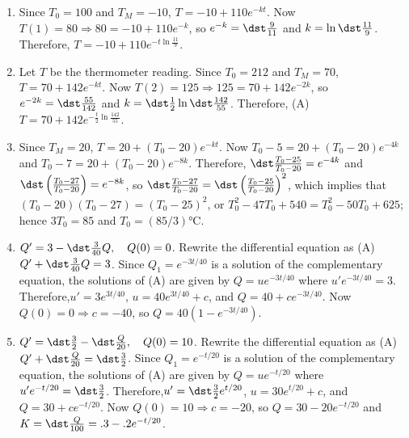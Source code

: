 \documentclass[openany]{book}
\newenvironment{sectionSolutions}{
 \begin{enumerate}[item-label={\thesection.\arabic{enumi}.}]
}{
 \end{enumerate}
}
\begin{document}
\begin{sectionSolutions}
\item
Since $T_0=100$ and $T_M=-10$, $T=-10+110e^{-kt}$. Now
$T(1)=80\Rightarrow 80=-10+110e^{-k}$, so $e^{-k}=\dst\frac{9}{11}$
and $k=\ln\dst\frac{11}{9}$. Therefore, $T=-10+110e^{-t\ln\frac{11}{9}}$.


\item
Let $T$ be the thermometer reading.
Since $T_0=212$ and $T_M=70$, $T=70+142e^{-kt}$. Now
$T(2)=125\Rightarrow 125=70+142e^{-2k}$, so
$e^{-2k}=\dst\frac{55}{142}$
and $k=\dst\frac{1}{2}\ln\dst\frac{142}{55}$. Therefore,
(A) $T=70+142e^{-\frac{t}{2}\ln\frac{142}{55}}$.


\item
Since $T_M=20$, $T=20+(T_0-20)e^{-kt}$. Now
$T_0-5=20+(T_0-20)e^{-4k}$  and $T_0-7=20+(T_0-20)e^{-8k}$. Therefore,
$\dst\frac{T_0-25}{ T_0-20}=e^{-4k}$ and $\dst\left(\frac{T_0-27}{
T_0-20}\right)=e^{-8k}$, so  $\dst\frac{T_0-27}{
T_0-20}=\dst\left(\frac{T_0-25}{ T_0-20}\right)^2$,
which implies that $(T_0-20)(T_0-27)=(T_0-25)^2$, or
$T_0^2-47T_0+540=T_0^2-50T_0+625$; hence $3T_0=85$
and  $T_0=(85/3)\unit{\degreeCelsius}$.



\item
$Q'=3-\dst\frac{3}{40}Q,\quad Q(0)=0$. Rewrite the differential equation
as (A) $Q'+\dst\frac{3}{40}Q=3$. Since $Q_1=e^{-3t/40}$ is a solution of
the complementary equation, the solutions of (A) are given by
$Q=ue^{-3t/40}$ where $u'e^{-3t/40}=3$. Therefore,$u'=3e^{3t/40}$,
$u=40e^{3t/40}+c$, and $Q=40+ce^{-3t/40}$. Now $Q(0)=0\Rightarrow
c=-40$, so $Q=40(1-e^{-3t/40})$.


\item
$Q'=\dst\frac{3}{2}-\dst\frac{Q}{20},\quad Q(0)=10$. Rewrite the
differential equation as (A) $Q'+\dst\frac{Q}{20}=\dst\frac{3}{2}$. Since
$Q_1=e^{-t/20}$ is a solution of the complementary equation, the
solutions of (A) are given by $Q=ue^{-t/20}$ where
$u'e^{-t/20}=\dst\frac{3}{2}$. Therefore,$u'=\dst\frac{3}{2}e^{t/20}$,
$u=30e^{t/20}+c$, and $Q=30+ce^{-t/20}$. Now $Q(0)=10\Rightarrow
c=-20$, so $Q=30-20e^{-t/20}$ and $K=\dst\frac{Q}{100}=.3-.2e^{-t/20}$.




\end{sectionSolutions}
\end{document}
